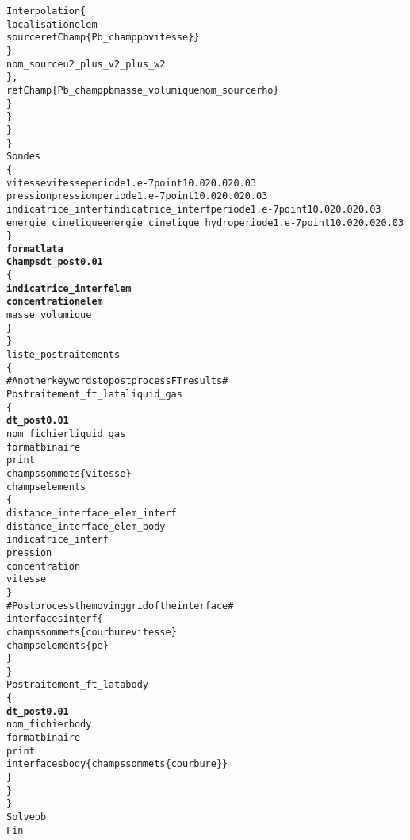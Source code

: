 \begin{alltt}
                                Interpolation \{
                                    localisation elem
                                    source refChamp \{ Pb_champ pb vitesse \} \}
                            \}
                            nom_source u2_plus_v2_plus_w2
                        \} ,
                        refChamp \{ Pb_champ pb masse_volumique nom_source rho \}
                    \}
                \}
            \}
        \}
        Sondes 
        \{
            vitesse vitesse periode 1.e-7 point 1 0.02 0.02 0.03
            pression pression periode 1.e-7 point 1 0.02 0.02 0.03
            indicatrice_interf indicatrice_interf periode 1.e-7 point 1 0.02 0.02 0.03
            energie_cinetique energie_cinetique_hydro periode 1.e-7 point 1 0.02 0.02 0.03
        \}
        {\bf{format lata}}
        {\bf{Champs dt_post 0.01 }}
        \{
            {\bf{indicatrice_interf elem}}
            {\bf{concentration elem}}
            masse_volumique
        \}
    \}
    liste_postraitements
    \{
        # Another keywords to post process FT results #
        Postraitement_ft_lata liquid_gas
        \{
            {\bf{dt_post 0.01 }}
            nom_fichier liquid_gas
            format binaire
            print
            champs sommets \{ vitesse \}
            champs elements
            \{
                distance_interface_elem_interf
                distance_interface_elem_body
                indicatrice_interf
                pression
                concentration
                vitesse
            \}
            # Post process the moving grid of the interface #
            interfaces interf \{
                champs sommets \{ courbure vitesse \}
                champs elements \{ pe \}
            \}
        \}
        Postraitement_ft_lata body
        \{
            {\bf{dt_post 0.01 }}
            nom_fichier body
            format binaire
            print
            interfaces body \{ champs sommets \{ courbure \} \}
        \}
    \}
\}
Solve pb
Fin
\end{alltt}
